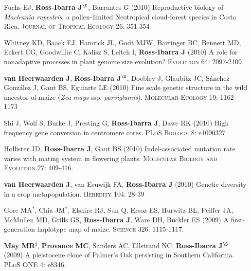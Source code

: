 \documentclass[letterpaper]{article}
\begin{document}
\begin{etaremune}
\item Fuchs EJ, {\bf Ross-Ibarra J}$^\S$, Barrantes G (2010) Reproductive biology of \emph{Macleania rupestris}: a pollen-limited Neotropical cloud-forest species in Costa Rica.  \textsc{Journal of Tropical Ecology} 26: 351-354

\item Whitney KD, Baack EJ, Hamrick JL, Godt MJW, Barringer BC, Bennett MD, Eckert CG, Goodwillie C, Kalisz S, Leitch I, {\bf Ross-Ibarra J} (2010) A role for nonadaptive processes in plant genome size evolution?  \textsc{Evolution} 64: 2097-2109

\item {\bf van Heerwaarden J}, {\bf Ross-Ibarra J}$^\S$, Doebley J, Glaubitz JC, S\'{a}nchez Gonz\'{a}lez J, Gaut BS, Eguiarte LE (2010) Fine scale genetic structure in the wild ancestor of maize (\emph{Zea mays} ssp. \emph{parviglumis}).  \textsc{Molecular Ecology} 19: 1162-1173

\item Shi J, Wolf S, Burke J, Presting G, {\bf Ross-Ibarra J}, Dawe RK (2010) High frequency gene conversion in centromere cores.  \textsc{PLoS Biology} 8: e1000327

\item Hollister JD, {\bf Ross-Ibarra J}, Gaut BS (2010) Indel-associated mutation rate varies with mating system in flowering plants.  \textsc{Molecular Biology and Evolution} 27: 409-416.

\item {\bf van Heerwaarden J}, van Eeuwijk FA, {\bf Ross-Ibarra J} (2010) Genetic diversity in a crop metapopulation.  \textsc{Heredity} 104: 28-39

\item Gore MA$^*$, Chia JM$^*$, Elshire RJ, Sun Q, Ersoz ES, Hurwitz BL, Peiffer JA, McMullen MD, Grills GS, {\bf Ross-Ibarra J}, Ware DH, Buckler ES (2009) A first-generation haplotype map of maize.  \textsc{Science 326}: 1115-1117.

\item {\bf May MR}$^\ddagger$, {\bf Provance MC}, Sanders AC, Ellstrand NC, {\bf Ross-Ibarra J}$^\S$ (2009) A pleistocene clone of Palmer's Oak persisting in Southern California.  \textsc{PLoS ONE} 4: e8346.


\end{etaremune}
\end{document}
